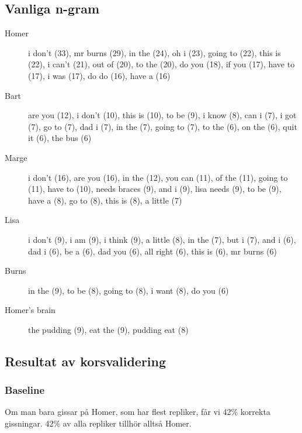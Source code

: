 \documentclass[a4paper]{article}
\begin{document}
\subsection{Vanliga n-gram}
\begin{description}
    \item[Homer] i don't (33), mr burns (29), in the (24), oh i (23), going to (22), this is (22), i can't (21), out of (20), to the (20), do you (18), if you (17), have to (17), i was (17), do do (16), have a (16)

    \item[Bart] are you (12), i don't (10), this is (10), to be (9), i know (8), can i (7), i got (7), go to (7), dad i (7), in the (7), going to (7), to the (6), on the (6), quit it (6), the bus (6)

    \item[Marge] i don't (16), are you (16), in the (12), you can (11), of the (11), going to (11), have to (10), needs braces (9), and i (9), lisa needs (9), to be (9), have a (8), go to (8), this is (8), a little (7)

    \item[Lisa] i don't (9), i am (9), i think (9), a little (8), in the (7), but i (7), and i (6), dad i (6), be a (6), dad you (6), all right (6), this is (6), mr burns (6)

    \item[Burns] in the (9), to be (8), going to (8), i want (8), do you (6)

    \item[Homer's brain] the pudding (9), eat the (9), pudding eat (8)
\end{description}
        
\subsection{Resultat av korsvalidering}

\subsubsection{Baseline}
Om man bara gissar på Homer, som har flest repliker, får vi 42\% korrekta
gissningar. 42\% av alla repliker tillhör alltså Homer.
\end{document}
